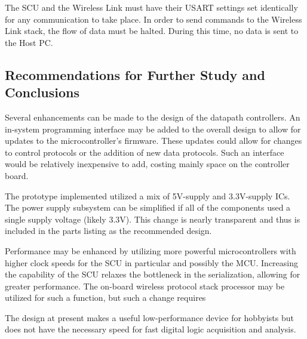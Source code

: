 The SCU and the Wireless Link must have their USART settings set identically for any communication to take place. In order to send commands to the Wireless Link
stack, the flow of data must be halted. During this time, no data is sent to the
Host PC.  

\subsection{Recommendations for Further Study and Conclusions}
Several enhancements can be made to the design of the datapath controllers.
An in-system programming interface may be added to the overall design to allow
for updates to the microcontroller's firmware. These updates could allow for 
changes to control protocols or the addition of new data protocols. Such an 
interface would be relatively inexpensive to add, costing mainly space on the 
controller board.

The prototype implemented utilized a mix of 5V-supply and 3.3V-supply ICs. The 
power supply subsystem can be simplified if all of the components used a single
supply voltage (likely 3.3V). This change is nearly transparent and thus is included in the parts listing as the recommended design.

Performance may be enhanced by utilizing more powerful microcontrollers with
higher clock speeds for the SCU in particular and possibly the MCU. Increasing 
the capability of the SCU relaxes the bottleneck in the serialization, allowing for greater performance. The on-board wireless protocol stack processor may be 
utilized for such a function, but such a change requires 

The design at present makes a useful low-performance device for hobbyists but 
does not have the necessary speed for fast digital logic acquisition and 
analysis. 
